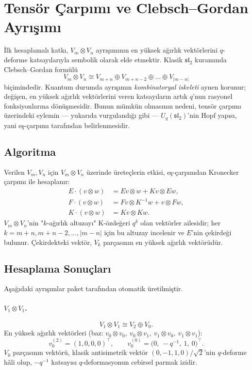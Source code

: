 \documentclass[10pt]{math}
\numberwithin{equation}{section}
\theoremstyle{plain}
\theoremstyle{definition}
\renewcommand{\sl}{\mathfrak{sl}}
\newcommand{\Uq}{U_q(\sl_2)}
\newcommand{\hwt}{v_0}
\begin{document}
\section{Tensör Çarpımı ve Clebsch--Gordan Ayrışımı}

İlk hesaplamalı katkı, $V_m \otimes V_n$ ayrışımının en yüksek ağırlık
vektörlerini $q$-deforme katsayılarıyla sembolik olarak elde etmektir. Klasik
$\sl_2$ kuramında Clebsch--Gordan formülü
\[
  V_m \otimes V_n \cong V_{m+n} \oplus V_{m+n-2} \oplus \dots \oplus V_{|m-n|}
\]
biçimindedir. Kuantum durumda ayrışımın \emph{kombinatoryal iskeleti} aynen
korunur; değişen, en yüksek ağırlık vektörlerini veren katsayıların artık
$q$'nun rasyonel fonksiyonlarına dönüşmesidir. Bunun mümkün olmasının nedeni,
tensör çarpımı üzerindeki eylemin --- yukarıda vurgulandığı gibi --- $\Uq$'nin
Hopf yapısı, yani eş-çarpımı tarafından belirlenmesidir.

\subsection{Algoritma}

Verilen $V_m, V_n$ için $V_m \otimes V_n$ üzerinde üreteçlerin etkisi,
eş-çarpımdan Kronecker çarpımı ile hesaplanır:
\begin{align*}
  E \cdot (v \otimes w) &= E v \otimes w + K v \otimes E w, \\
  F \cdot (v \otimes w) &= F v \otimes K^{-1} w + v \otimes F w, \\
  K \cdot (v \otimes w) &= K v \otimes K w.
\end{align*}
$V_m \otimes V_n$'nin "$k$-ağırlık altuzayı" K-özdeğeri $q^k$ olan
vektörler ailesidir; her $k = m+n, m+n-2, \dots, |m-n|$ için bu altuzay
incelenir ve $E$'nin çekirdeği bulunur. Çekirdekteki vektör, $V_k$
parçasının en yüksek ağırlık vektörüdür.

\subsection{Hesaplama Sonuçları}

Aşağıdaki ayrışımlar paket tarafından otomatik üretilmiştir.

\paragraph{$V_1 \otimes V_1$.}
\[
  V_1 \otimes V_1 \cong V_2 \oplus V_0.
\]
En yüksek ağırlık vektörleri (baz: $v_0\!\otimes\! v_0,\ v_0\!\otimes\! v_1,\ v_1\!\otimes\! v_0,\ v_1\!\otimes\! v_1$):
\[
  \hwt^{(2)} = (1, 0, 0, 0)^\top, \qquad
  \hwt^{(0)} = \big(0,\ -q^{-1},\ 1,\ 0\big)^\top.
\]
$V_0$ parçasının vektörü, klasik antisimetrik vektör
$(0, -1, 1, 0)/\sqrt{2}$'nin $q$-deforme hâli olup, $-q^{-1}$ katsayısı
$q$-deformasyonun cebirsel parmak izidir.
\end{document}
